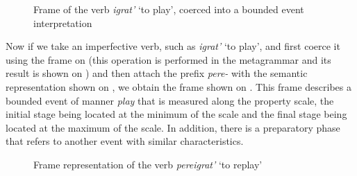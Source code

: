 \begin{figure}
\centering
{}
\caption{Frame of the verb \textit{igrat'} `to play', coerced into a bounded event interpretation \label{frame:igrat:coerce}}
\end{figure}

Now if we take an imperfective verb, such as \textit{igrat'} `to play', and first coerce it using the frame on  (this operation is performed in the metagrammar and its result is shown on ) and then attach the prefix \textit{pere-} with the semantic representation shown on , we obtain the frame shown on . This frame describes a bounded event of manner \textit{play} that is measured along the property scale, the initial stage being located at the minimum of the scale and the final stage being located at the maximum of the scale. In addition, there is a preparatory phase that refers to another event with similar characteristics.

\begin{figure}
\centering
{}
\caption{Frame representation of the verb \textit{pereigrat'} `to replay' \label{frame:pere:igrat}}
\end{figure}

